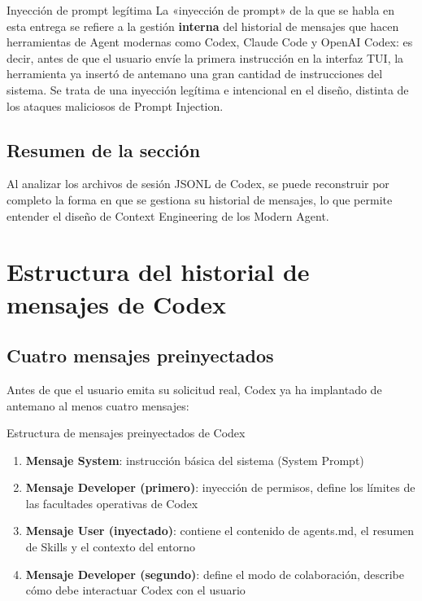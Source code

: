 \documentclass[a4paper]{article}
\begin{document}
\begin{importantbox}{Inyección de prompt legítima}
La «inyección de prompt» de la que se habla en esta entrega se refiere a la gestión \textbf{interna} del historial de mensajes que hacen herramientas de Agent modernas como Codex, Claude Code y OpenAI Codex: es decir, antes de que el usuario envíe la primera instrucción en la interfaz TUI, la herramienta ya insertó de antemano una gran cantidad de instrucciones del sistema. Se trata de una inyección legítima e intencional en el diseño, distinta de los ataques maliciosos de Prompt Injection.
\end{importantbox}

\subsection{Resumen de la sección}

Al analizar los archivos de sesión JSONL de Codex, se puede reconstruir por completo la forma en que se gestiona su historial de mensajes, lo que permite entender el diseño de Context Engineering de los Modern Agent.

\section{Estructura del historial de mensajes de Codex}

\subsection{Cuatro mensajes preinyectados}

Antes de que el usuario emita su solicitud real, Codex ya ha implantado de antemano al menos cuatro mensajes:

\begin{importantbox}{Estructura de mensajes preinyectados de Codex}
\begin{enumerate}
    \item \textbf{Mensaje System}: instrucción básica del sistema (System Prompt)
    \item \textbf{Mensaje Developer (primero)}: inyección de permisos, define los límites de las facultades operativas de Codex
    \item \textbf{Mensaje User (inyectado)}: contiene el contenido de agents.md, el resumen de Skills y el contexto del entorno
    \item \textbf{Mensaje Developer (segundo)}: define el modo de colaboración, describe cómo debe interactuar Codex con el usuario
\end{enumerate}
\end{importantbox}
\end{document}
